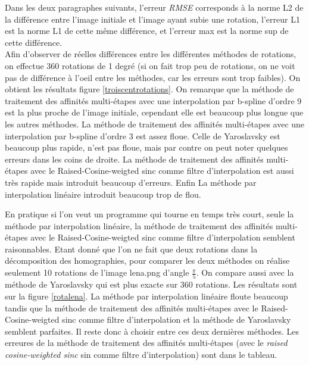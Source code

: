 	Dans les deux paragraphes suivants, l'erreur \emph{RMSE} corresponds à la norme L2 de la différence entre l'image initiale et l'image ayant subie une rotation, l'erreur L1 est la norme L1 de cette même différence, et l'erreur max est la norme sup de cette différence.\\

	Afin d'observer de réelles différences entre les différentes méthodes de rotations, on effectue 360 rotations de 1 degré (si on fait trop peu de rotations, on ne voit pas de différence à l'oeil entre les méthodes, car les erreurs sont trop faibles). On obtient les résultats figure  \ref{troiscentrotations}.  On remarque que la méthode de traitement des affinités multi-étapes avec une interpolation par b-spline d'ordre 9 est la plus proche de l'image initiale, cependant elle est beaucoup plus longue que les autres méthodes.  La méthode de traitement des affinités multi-étapes avec une interpolation par b-spline d'ordre 3 est assez floue. Celle de Yaroslavsky est beaucoup plus rapide, n'est pas floue, mais par contre on peut noter quelques erreurs dans les coins de droite. La méthode de traitement des affinités multi-étapes avec le  Raised-Cosine-weigted sinc comme filtre d'interpolation est aussi très rapide mais introduit beaucoup d'erreurs. Enfin La méthode par interpolation linéaire introduit beaucoup trop de flou.\\
\label{pleinsderotations}

	En pratique si l'on veut un programme qui tourne en temps très court, seule la méthode par interpolation linéaire, la méthode de traitement des affinités multi-étapes avec le Raised-Cosine-weigted sinc comme filtre d'interpolation semblent raisonnables. Etant donné que l'on ne fait que deux rotations dans la décomposition des homographies, pour comparer les deux méthodes on réalise seulement 10 rotations de l'image lena.png d'angle $\frac{\pi}{5}$. On compare aussi avec la méthode de Yaroslavsky qui est plus exacte sur 360 rotations. Les résultats sont sur la figure \ref{rotalena}. La méthode par interpolation linéaire floute beaucoup tandis que la méthode de traitement des affinités multi-étapes avec le  Raised-Cosine-weigted sinc comme filtre d'interpolation et la méthode de Yaroslavsky semblent parfaites. Il reste donc à choisir entre ces deux dernières méthodes. Les erreures de la méthode de traitement des affinités multi-étapes (avec le \emph{raised cosine-weighted sinc} sin comme filtre d'interpolation) sont dans le tableau.  \\


